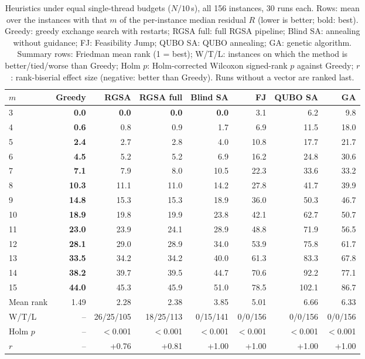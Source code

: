 \begin{table}[t]
\centering
\footnotesize
\setlength{\tabcolsep}{3pt}
\caption{Heuristics under equal single-thread budgets ($N/10$\,s), all 156 instances, 30 runs each. Rows: mean over the instances with that $m$ of the per-instance median residual $R$ (lower is better; bold: best). Greedy: greedy exchange search with restarts; RGSA full: full RGSA pipeline; Blind SA: annealing without guidance; FJ: Feasibility Jump; QUBO SA: QUBO annealing; GA: genetic algorithm. Summary rows: Friedman mean rank (1 = best); W/T/L: instances on which the method is better/tied/worse than Greedy; Holm $p$: Holm-corrected Wilcoxon signed-rank $p$ against Greedy; $r$: rank-biserial effect size (negative: better than Greedy). Runs without a vector are ranked last.}\label{tab:main}
\begin{tabular}{lrrrrrrr}
\toprule
$m$ & Greedy & RGSA & RGSA full & Blind SA & FJ & QUBO SA & GA \\
\midrule
3 & \textbf{0.0} & \textbf{0.0} & \textbf{0.0} & \textbf{0.0} & 3.1 & 6.2 & 9.8 \\
4 & \textbf{0.6} & 0.8 & 0.9 & 1.7 & 6.9 & 11.5 & 18.0 \\
5 & \textbf{2.4} & 2.7 & 2.8 & 4.0 & 10.8 & 17.7 & 21.7 \\
6 & \textbf{4.5} & 5.2 & 5.2 & 6.9 & 16.2 & 24.8 & 30.6 \\
7 & \textbf{7.1} & 7.9 & 8.0 & 10.5 & 22.3 & 33.6 & 33.2 \\
8 & \textbf{10.3} & 11.1 & 11.0 & 14.2 & 27.8 & 41.7 & 39.9 \\
9 & \textbf{14.8} & 15.3 & 15.3 & 18.9 & 36.0 & 50.3 & 46.7 \\
10 & \textbf{18.9} & 19.8 & 19.9 & 23.8 & 42.1 & 62.7 & 50.7 \\
11 & \textbf{23.0} & 23.9 & 24.1 & 28.9 & 48.8 & 71.9 & 56.5 \\
12 & \textbf{28.1} & 29.0 & 28.9 & 34.0 & 53.9 & 75.8 & 61.7 \\
13 & \textbf{33.5} & 34.2 & 34.2 & 40.0 & 61.3 & 83.3 & 67.8 \\
14 & \textbf{38.2} & 39.7 & 39.5 & 44.7 & 70.6 & 92.2 & 77.1 \\
15 & \textbf{44.0} & 45.3 & 45.9 & 51.0 & 78.5 & 102.1 & 86.7 \\
\midrule
Mean rank & 1.49 & 2.28 & 2.38 & 3.85 & 5.01 & 6.66 & 6.33 \\
W/T/L & -- & 26/25/105 & 18/25/113 & 0/15/141 & 0/0/156 & 0/0/156 & 0/0/156 \\
Holm $p$ & -- & $<$0.001 & $<$0.001 & $<$0.001 & $<$0.001 & $<$0.001 & $<$0.001 \\
$r$ & -- & +0.76 & +0.81 & +1.00 & +1.00 & +1.00 & +1.00 \\
\bottomrule
\end{tabular}
\end{table}
